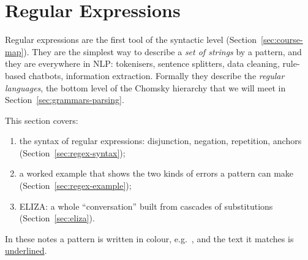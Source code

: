 \section{Regular Expressions}
\label{sec:regular-expressions}

Regular expressions are the first tool of the syntactic level
(Section~\ref{sec:course-map}). They are the simplest way to describe a \emph{set of
strings} by a pattern, and they are everywhere in NLP: tokenisers, sentence splitters,
data cleaning, rule-based chatbots, information extraction. Formally they describe the
\emph{regular languages}, the bottom level of the Chomsky hierarchy that we will meet in
Section~\ref{sec:grammars-parsing}.

This section covers:
\begin{enumerate}[nosep]
  \item the syntax of regular expressions: disjunction, negation, repetition, anchors
        (Section~\ref{sec:regex-syntax});
  \item a worked example that shows the two kinds of errors a pattern can make
        (Section~\ref{sec:regex-example});
  \item ELIZA: a whole ``conversation'' built from cascades of substitutions
        (Section~\ref{sec:eliza}).
\end{enumerate}

In these notes a pattern is written in colour, e.g.\ , and the text it
matches is \underline{underlined}.




